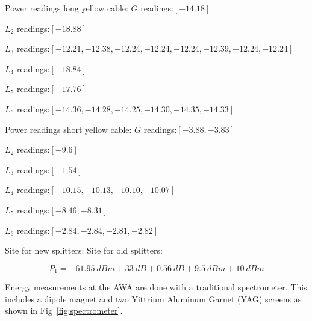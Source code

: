 	
	Power readings long yellow cable:
$G$ readings:$[-14.18]$	

$L_2$ readings:$[-18.88]$

$L_3$ readings:$[-12.21,-12.38, -12.24, -12.24, -12.24, -12.39, -12.24, -12.24]$

$L_4$ readings:$[-18.84]$

$L_5$ readings:$[-17.76]$

$L_6$ readings:$[-14.36,-14.28,-14.25,-14.30,-14.35,-14.33]$

Power readings short yellow cable:
$G$ readings:$[-3.88, -3.83]$	

$L_2$ readings:$[-9.6]$

$L_3$ readings:$[-1.54]$

$L_4$ readings:$[-10.15, -10.13, -10.10, -10.07]$

$L_5$ readings:$[-8.46,-8.31]$

$L_6$ readings:$[-2.84, -2.84, -2.81, -2.82]$

Site for new splitters: %
Site for old splitters: %


\begin{equation}
P_1 = \SI{-61.95}{dBm} + \SI{33}{dB} + \SI{0.56}{dB} + \SI{9.5}{dBm} +\SI{10}{dBm}
\end{equation}



 \label{sec:dipolecal}
Energy measurements at the AWA are done with a traditional 
spectrometer. This includes a dipole magnet and two Yittrium 
Aluminum Garnet (YAG) screens as shown in Fig~\ref{fig:spectrometer}.

